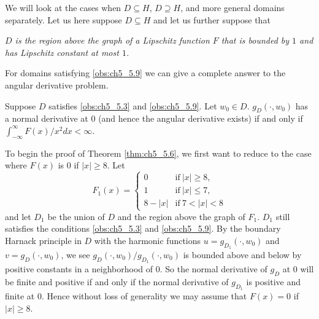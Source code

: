 

We will look at the cases when $D \subseteq H$, $D \supseteq H$, and more general domains separately. Let us here suppose $D \subseteq H$ and let us further suppose that

\begin{obs}\label{obs:ch5_5.9}
    \textit{$D$ is the region above the graph of a Lipschitz function $F$ that is bounded by $1$ and has Lipschitz constant at most $1$.}
\end{obs}

For domains satisfying \eqref{obs:ch5_5.9} we can give a complete answer to the angular derivative problem.

\begin{theorem}\label{thm:ch5_5.6}
Suppose $D$ satisfies \eqref{obs:ch5_5.3} and \eqref{obs:ch5_5.9}. Let $w_0 \in D$. $g_D(\cdot,w_0)$ has a normal derivative at $0$ (and hence the angular derivative exists) if and only if $\int_{-\infty}^{\infty} F(x)/x^2dx < \infty$.
\end{theorem}

To begin the proof of Theorem \ref{thm:ch5_5.6}, we first want to reduce to the case where $F(x)$ is $0$ if $|x| \geq 8$. Let
\[
    F_1(x) = \begin{cases}
        0 & \text{if}~|x| \geq 8,\\
        1 & \text{if}~|x| \leq 7,\\
        8-|x| & \text{if}~7 < |x| < 8
    \end{cases}
\]
and let $D_1$ be the union of $D$ and the region above the graph of $F_1$. $D_1$ still satisfies the conditions \eqref{obs:ch5_5.3} and \eqref{obs:ch5_5.9}. By the boundary Harnack principle in $D$ with the harmonic functions $u = g_{D_1}(\cdot,w_0)$ and $v = g_D(\cdot,w_0)$, we see $g_D(\cdot,w_0)/g_{D_1}(\cdot,w_0)$ is bounded above and below by positive constants in a neighborhood of $0$. So the normal derivative of $g_D$ at $0$ will be finite and positive if and only if the normal derivative of $g_{D_1}$ is positive and finite at $0$. Hence without loss of generality we may assume that $F(x) = 0$ if $|x| \geq 8$.

